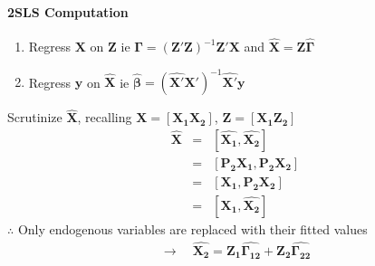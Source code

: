 \paragraph{2SLS Computation}
\begin{enumerate}[1)]
    \item Regress $\boldsymbol{X}$ on $\boldsymbol{Z}$  ie $\boldsymbol{\Gamma}=(\boldsymbol{Z'Z})^{-1}\boldsymbol{Z'X}$ and $\boldsymbol{\hat{X}}=\boldsymbol{Z\hat{\Gamma}}$
    \item Regress $\boldsymbol{y}$ on $\boldsymbol{\hat{X}}$    ie $\boldsymbol{\hat{\beta}}=(\boldsymbol{\hat{X'}X'})^{-1}\boldsymbol{\hat{X'}y}$
\end{enumerate}
Scrutinize $\boldsymbol{\hat{X}}$, recalling $\boldsymbol{X}=[\boldsymbol{X_{1}X_{2}}]$, $\boldsymbol{Z}=[\boldsymbol{X_{1}Z_{2}}]$
\begin{eqnarray*}
\boldsymbol{\hat{X}} &=& [\boldsymbol{\hat{X_{1}}},\boldsymbol{\hat{X_{2}}}]\\
&=& [\boldsymbol{P_{2}X_{1}},\boldsymbol{P_{2}X_{2}}]\\
&=& [\boldsymbol{X_{1}},\boldsymbol{P_{2}X_{2}}]\\
&=& [\boldsymbol{X_{1}},\boldsymbol{\hat{X_{2}}}]
\end{eqnarray*}
$\therefore$ Only endogenous variables are replaced with their fitted values
\begin{eqnarray*}
\to\quad\boldsymbol{\hat{X_{2}}}=\boldsymbol{Z_{1}\hat{\Gamma_{12}}}+\boldsymbol{Z_{2}\hat{\Gamma_{22}}}
\end{eqnarray*}
